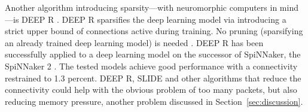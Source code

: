 \documentclass[]{article}
\begin{document}
Another algorithm introducing sparsity---with neuromorphic computers
in mind---is DEEP R \citep{bellec_et_al_2017}.
DEEP R sparsifies the deep learning model via introducing a strict
upper bound of connections active during training.
No pruning (sparsifying an already trained deep learning model)
is needed \citep{bellec_et_al_2017}.
DEEP R has been successfully applied to a deep learning model on the
successor of SpiNNaker, the SpiNNaker 2 \citep{liu_et_al_2018}.
The tested models achieve good performance with a connectivity
restrained to 1.3 percent.
DEEP R, SLIDE and other algorithms that reduce the connectivity could
help with the obvious problem of too many packets, but also reducing
memory pressure, another problem discussed in
Section~\ref{sec:discussion}.





\end{document}
